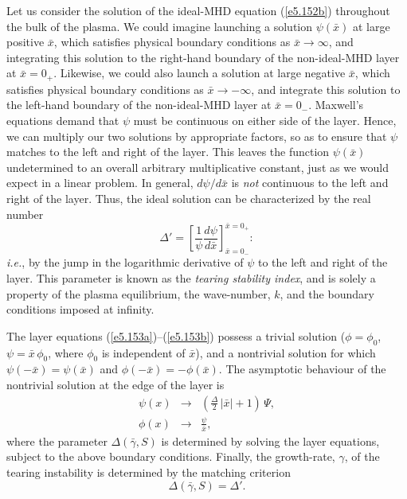 Let us consider the solution of the ideal-MHD equation (\ref{e5.152b}) throughout
the bulk of the plasma. We could imagine launching a solution $\psi(\bar{x})$
 at large positive
$\bar{x}$, which satisfies physical boundary conditions as $\bar{x}\rightarrow
\infty$, and integrating this solution to the right-hand boundary of
the non-ideal-MHD layer at $\bar{x}=0_+$. Likewise, we could also launch
a solution at large negative $\bar{x}$, which satisfies physical boundary
conditions as $\bar{x}\rightarrow-\infty$, and integrate this solution to
the left-hand boundary of the non-ideal-MHD layer at $\bar{x}=0_-$. 
Maxwell's equations demand that $\psi$ must be continuous on either side
of the layer.
Hence, we can multiply our two solutions by appropriate factors, so as to ensure that
$\psi$ matches to the left and right of the layer. This leaves
the function  $\psi(\bar{x})$ undetermined
to an overall arbitrary multiplicative constant, just  as we would expect in a
linear problem. In general, $d\psi/d\bar{x}$ is {\em not} continuous to the left and
right of the layer. Thus, the ideal solution can be characterized by the
real number
\begin{equation}
{\Delta}' =
\left[\frac{1}{\psi}\frac{d\psi}{d\bar{x}}\right]_{\bar{x}=0_-}^{\bar{x}=0_+}:
\end{equation}
{\em i.e.}, by the jump in the logarithmic derivative of $\psi$ to the left and
right of the layer.
This parameter is known as the {\em tearing stability index}, and is solely
a property
of the plasma equilibrium, the wave-number, $k$, 
 and the boundary conditions imposed at infinity.

The layer equations (\ref{e5.153a})--(\ref{e5.153b}) possess a trivial solution ($\phi=\phi_0$,
$\psi=\bar{x}\,\phi_0$, where $\phi_0$ is independent of $\bar{x}$), and
a nontrivial solution for which $\psi(-\bar{x})=\psi(\bar{x})$ and $\phi(-\bar{x})
=-\phi(\bar{x})$.
The asymptotic behaviour of the nontrivial solution at the
edge of the layer is
\begin{eqnarray}\label{e5.192x}
\psi(x) &\rightarrow & \left(\frac{\Delta}{2}\,|\bar{x}| + 1\right)\,
{\Psi},\\[0.5ex]
\phi(x) &\rightarrow & \frac{\psi}{\bar{x}},\label{e5.193x}
\end{eqnarray}
where the parameter ${\Delta}(\bar{\gamma}, S)$ is determined by solving the
layer equations, subject to the above boundary
conditions. Finally, the growth-rate, $\gamma$, of the tearing instability is determined
by the matching criterion
\begin{equation}\label{e5.157}
{\Delta}(\bar{\gamma}, S) = {\Delta}'.
\end{equation}

